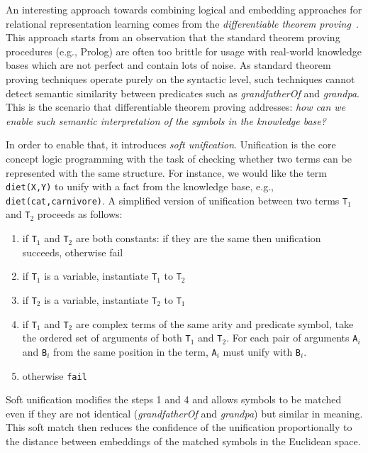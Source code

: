 An interesting approach towards combining logical and embedding approaches for relational representation learning comes from the \textit{differentiable theorem proving}~\cite{DTP2017}.
This approach starts from an observation that the standard theorem proving procedures (e.g., Prolog) are often too brittle for usage with real-world knowledge bases which are not perfect and contain lots of noise.
As standard theorem proving techniques operate purely on the syntactic level, such techniques cannot detect semantic similarity between predicates such as \textit{grandfatherOf} and \textit{grandpa}.
This is the scenario that differentiable theorem proving addresses: \textit{how can we enable such semantic interpretation of the symbols in the knowledge base?}


In order to enable that, it introduces \textit{soft unification}.
Unification is the core concept logic programming with the task of checking whether two terms can be represented with the same structure.
For instance, we would like the term \texttt{diet(X,Y)} to unify with a fact from the knowledge base, e.g., \texttt{diet(cat,carnivore)}.
A simplified version of unification between two terms \texttt{T}$_1$ and \texttt{T}$_2$ proceeds as follows:
\begin{enumerate}
	\item if \texttt{T}$_1$ and \texttt{T}$_2$ are both constants: if they are the same then unification succeeds, otherwise fail
	\item if \texttt{T}$_1$ is a variable, instantiate \texttt{T}$_1$ to \texttt{T}$_2$
	\item if \texttt{T}$_2$ is a variable, instantiate \texttt{T}$_2$ to \texttt{T}$_1$
	\item if \texttt{T}$_1$ and \texttt{T}$_2$ are complex terms of the same arity and predicate symbol, take the ordered set of arguments of both \texttt{T}$_1$ and \texttt{T}$_2$. For each pair of arguments \texttt{A}$_i$ and \texttt{B}$_i$ from the same position in the term, \texttt{A}$_i$ must unify with \texttt{B}$_i$.
	\item otherwise \texttt{fail}
\end{enumerate}


Soft unification modifies the steps 1 and 4 and allows symbols to be matched even if they are not identical (\textit{grandfatherOf} and \textit{grandpa}) but similar in meaning. %
This soft match then reduces the confidence of the unification proportionally to the distance between embeddings of the matched symbols in the Euclidean space.












\cleardoublepage

